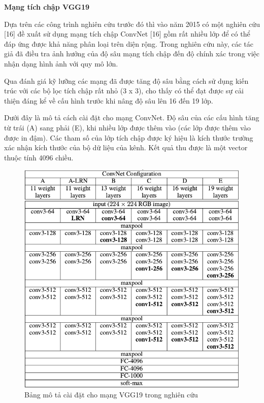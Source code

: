 \documentclass[12pt]{report}
\begin{document}
																				
		\textbf{Mạng tích chập VGG19 \cite{cia_vgg19}}
																						
		Dựa trên các công trình nghiên cứu trước đó thì vào năm 2015 có một nghiên cứu [16] đề xuất sử dụng mạng tích chập ConvNet [16] gồm rất nhiều lớp để có thể đáp ứng được khả năng phân loại trên diện rộng. Trong nghiên cứu này, các tác giả đã điều tra ảnh hưởng của độ sâu mạng tích chập đến độ chính xác trong việc nhận dạng hình ảnh với quy mô lớn.  
																						
		Qua đánh giá kỹ lưỡng các mạng đã được tăng độ sâu bằng cách sử dụng kiến trúc với các bộ lọc tích chập rất nhỏ (3 x 3), cho thấy có thể đạt được sự cải thiện đáng kể về cấu hình trước khi nâng độ sâu lên 16 đến 19 lớp.
																						
		Dưới đây là mô tả cách cài đặt cho mạng ConvNet. Độ sâu của các cấu hình tăng từ trái (A) sang phải (E), khi nhiều lớp được thêm vào (các lớp được thêm vào được in đậm). Các tham số của lớp tích chập được ký hiệu là kích thước trường xác nhận kích thước của bộ dữ liệu của kênh. Kết quả thu được là một vector thuộc tính 4096 chiều.
																						
		\begin{figure}[h]
			\centering
			\includegraphics[scale=0.6]{vgg19_table}
			\caption{Bảng mô tả cài đặt cho mạng VGG19 trong nghiên cứu \cite{cia_vgg19} }
			\label{fig:vgg19_table}
		\end{figure}
																				
\end{document}
